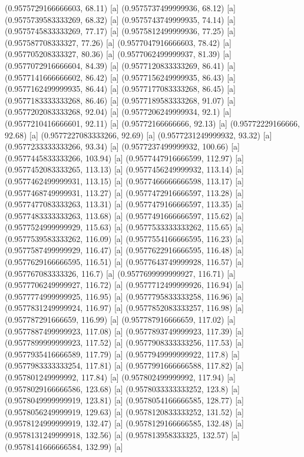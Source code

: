 {{{(0.9575729166666603, 68.11) [a] 
(0.9575737499999936, 68.12) [a] 
(0.9575739583333269, 68.32) [a] 
(0.9575743749999935, 74.14) [a] 
(0.9575745833333269, 77.17) [a] 
(0.9575812499999936, 77.25) [a] 
(0.957587708333327, 77.26) [a] 
(0.9577047916666603, 78.42) [a] 
(0.957705208333327, 80.36) [a] 
(0.9577062499999937, 81.39) [a] 
(0.9577072916666604, 84.39) [a] 
(0.9577120833333269, 86.41) [a] 
(0.9577141666666602, 86.42) [a] 
(0.9577156249999935, 86.43) [a] 
(0.9577162499999935, 86.44) [a] 
(0.9577177083333268, 86.45) [a] 
(0.9577183333333268, 86.46) [a] 
(0.9577189583333268, 91.07) [a] 
(0.9577202083333268, 92.04) [a] 
(0.9577206249999934, 92.1) [a] 
(0.9577210416666601, 92.11) [a] 
(0.95772166666666, 92.13) [a] 
(0.95772229166666, 92.68) [a] 
(0.9577227083333266, 92.69) [a] 
(0.9577231249999932, 93.32) [a] 
(0.9577233333333266, 93.34) [a] 
(0.9577237499999932, 100.66) [a] 
(0.9577445833333266, 103.94) [a] 
(0.9577447916666599, 112.97) [a] 
(0.9577452083333265, 113.13) [a] 
(0.9577456249999932, 113.14) [a] 
(0.9577462499999931, 113.15) [a] 
(0.9577466666666598, 113.17) [a] 
(0.9577468749999931, 113.27) [a] 
(0.9577472916666597, 113.28) [a] 
(0.9577477083333263, 113.31) [a] 
(0.9577479166666597, 113.35) [a] 
(0.9577483333333263, 113.68) [a] 
(0.9577491666666597, 115.62) [a] 
(0.9577524999999929, 115.63) [a] 
(0.9577533333333262, 115.65) [a] 
(0.9577539583333262, 116.09) [a] 
(0.9577554166666595, 116.23) [a] 
(0.9577587499999929, 116.47) [a] 
(0.9577622916666595, 116.48) [a] 
(0.9577629166666595, 116.51) [a] 
(0.9577643749999928, 116.57) [a] 
(0.957767083333326, 116.7) [a] 
(0.9577699999999927, 116.71) [a] 
(0.9577706249999927, 116.72) [a] 
(0.9577712499999926, 116.94) [a] 
(0.9577774999999925, 116.95) [a] 
(0.9577795833333258, 116.96) [a] 
(0.9577831249999924, 116.97) [a] 
(0.9577852083333257, 116.98) [a] 
(0.957787291666659, 116.99) [a] 
(0.957787916666659, 117.02) [a] 
(0.9577887499999923, 117.08) [a] 
(0.9577893749999923, 117.39) [a] 
(0.9577899999999923, 117.52) [a] 
(0.9577908333333256, 117.53) [a] 
(0.9577935416666589, 117.79) [a] 
(0.9577949999999922, 117.8) [a] 
(0.9577983333333254, 117.81) [a] 
(0.9577991666666588, 117.82) [a] 
(0.957801249999992, 117.84) [a] 
(0.957802499999992, 117.94) [a] 
(0.9578029166666586, 123.68) [a] 
(0.9578033333333252, 123.8) [a] 
(0.9578049999999919, 123.81) [a] 
(0.9578054166666585, 128.77) [a] 
(0.9578056249999919, 129.63) [a] 
(0.9578120833333252, 131.52) [a] 
(0.9578124999999919, 132.47) [a] 
(0.9578129166666585, 132.48) [a] 
(0.9578131249999918, 132.56) [a] 
(0.957813958333325, 132.57) [a] 
(0.9578141666666584, 132.99) [a] 
}}}
